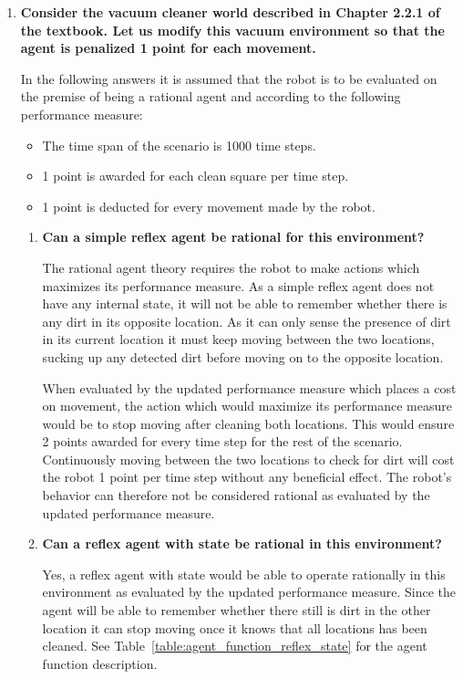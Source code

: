 \begin{enumerate}
\begin{enumerate}
\end{enumerate}

\item \textbf{Consider the vacuum cleaner world described in Chapter 2.2.1 of the textbook. Let us modify this vacuum environment so that the agent is penalized 1 point for each movement.}\nopagebreak

In the following answers it is assumed that the robot is to be evaluated on the premise of being a rational agent and according to the following performance measure:

\begin{itemize}
\item The time span of the scenario is 1000 time steps.
\item 1 point is awarded for each clean square per time step.
\item 1 point is deducted for every movement made by the robot.
\end{itemize}

\begin{enumerate}

\item \textbf{Can a simple reflex agent be rational for this environment?}\nopagebreak

The rational agent theory requires the robot to make actions which maximizes its performance measure. As a simple reflex agent does not have any internal state, it will not be able to remember whether there is any dirt in its opposite location. As it can only sense the presence of dirt in its current location it must keep moving between the two locations, sucking up any detected dirt before moving on to the opposite location.

When evaluated by the updated performance measure which places a cost on movement, the action which would maximize its performance measure would be to stop moving after cleaning both locations. This would ensure 2 points awarded for every time step for the rest of the scenario. Continuously moving between the two locations to check for dirt will cost the robot 1 point per time step without any beneficial effect. The robot's behavior can therefore not be considered rational as evaluated by the updated performance measure.

\item \textbf{Can a reflex agent with state be rational in this environment?}\nopagebreak

Yes, a reflex agent with state would be able to operate rationally in this environment as evaluated by the updated performance measure. Since the agent will be able to remember whether there still is dirt in the other location it can stop moving once it knows that all locations has been cleaned. See Table~\ref{table:agent_function_reflex_state} for the agent function description.


\end{enumerate}
\end{enumerate}
